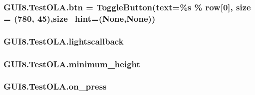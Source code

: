 \subsubsection[{\texorpdfstring{btn}{btn}}]{\setlength{\rightskip}{0pt plus 5cm}G\+U\+I8.\+Test\+O\+L\+A.\+btn = Toggle\+Button(text=\textquotesingle{}\%s\textquotesingle{} \% row\mbox{[}0\mbox{]}, size = (780, 45),size\+\_\+hint=(None,None))\hspace{0.3cm}{\ttfamily [static]}}\hypertarget{classGUI8_1_1TestOLA_a78e9853d8b616e79fda2e34024a6bd4c}{}\label{classGUI8_1_1TestOLA_a78e9853d8b616e79fda2e34024a6bd4c}
\subsubsection[{\texorpdfstring{lightscallback}{lightscallback}}]{\setlength{\rightskip}{0pt plus 5cm}G\+U\+I8.\+Test\+O\+L\+A.\+lightscallback\hspace{0.3cm}{\ttfamily [static]}}\hypertarget{classGUI8_1_1TestOLA_a8ee884d6a8831940d294205f14ac7547}{}\label{classGUI8_1_1TestOLA_a8ee884d6a8831940d294205f14ac7547}
\subsubsection[{\texorpdfstring{minimum\+\_\+height}{minimum_height}}]{\setlength{\rightskip}{0pt plus 5cm}G\+U\+I8.\+Test\+O\+L\+A.\+minimum\+\_\+height\hspace{0.3cm}{\ttfamily [static]}}\hypertarget{classGUI8_1_1TestOLA_adadd8451d0ba699f9cfd55e8d855f7d8}{}\label{classGUI8_1_1TestOLA_adadd8451d0ba699f9cfd55e8d855f7d8}
\subsubsection[{\texorpdfstring{on\+\_\+press}{on_press}}]{\setlength{\rightskip}{0pt plus 5cm}G\+U\+I8.\+Test\+O\+L\+A.\+on\+\_\+press\hspace{0.3cm}{\ttfamily [static]}}\hypertarget{classGUI8_1_1TestOLA_a2d2baddb978f949678551f521b9cdff0}{}\label{classGUI8_1_1TestOLA_a2d2baddb978f949678551f521b9cdff0}

